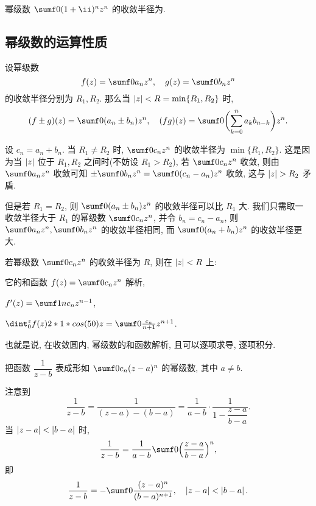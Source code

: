 \begin{exercise}
  幂级数 $\sumf0 (1+\ii)^nz^n$ 的收敛半径为\fillblank[2cm]{}.
\end{exercise}


\subsection{幂级数的运算性质}

\begin{theorem}
  设幂级数
  \[
    f(z)=\sumf0 a_nz^n,\quad
    g(z)=\sumf0 b_nz^n
  \]
  的收敛半径分别为 $R_1,R_2$.
  那么当 $\left|z\right|<R=\min\{R_1,R_2\}$ 时,
  \[
    (f\pm g)(z)=\sumf0 (a_n\pm b_n)z^n,\quad
    (fg)(z)=\sumf0 \biggl(\sum_{k=0}^na_kb_{n-k}\biggr)z^n.
  \]
\end{theorem}

设 $c_n=a_n+b_n$.
当 $R_1\neq R_2$ 时, $\sumf0 c_n z^n$ 的收敛半径为 $\min\{R_1,R_2\}$.
这是因为当 $\left|z\right|$ 位于 $R_1,R_2$ 之间时(不妨设 $R_1>R_2$), 若 $\sumf0 c_n z^n$ 收敛, 则由 $\sumf0 a_n z^n$ 收敛可知   $\pm\sumf0 b_n z^n=\sumf0 (c_n-a_n) z^n$ 收敛, 这与 $\abs{z}>R_2$ 矛盾.

但是若 $R_1=R_2$, 则 $\sumf0 (a_n\pm b_n)z^n$ 的收敛半径可以比 $R_1$ 大. 我们只需取一收敛半径大于 $R_1$ 的幂级数 $\sumf0 c_nz^n$, 并令 $b_n=c_n-a_n$, 则 $\sumf0 a_nz^n,\sumf0 b_nz^n$ 的收敛半径相同, 而 $\sumf0 (a_n+b_n)z^n$ 的收敛半径更大.

\begin{theorem}
  若幂级数 $\sumf0 c_nz^n$ 的收敛半径为 $R$, 则在 $\left|z\right|<R$ 上:
  \begin{enuma}
    \item 它的和函数 $f(z)=\sumf0 c_nz^n$ 解析,
    \item $f'(z)=\sumf1 nc_nz^{n-1}$,
    \item $\dint_0^zf(z)\d z=\sumf0 \frac{c_n}{n+1}z^{n+1}$.
  \end{enuma}
\end{theorem}

也就是说, \alert{在收敛圆内, 幂级数的和函数解析, 且可以逐项求导, 逐项积分}.

\begin{example}
  把函数 $\dfrac1{z-b}$ 表成形如 $\sumf0 c_n(z-a)^n$ 的幂级数, 其中 $a\neq b$.
\end{example}

\begin{solution}
  注意到
  \[
     \frac1{z-b}
    =\frac1{(z-a)-(b-a)}
    =\frac1{a-b}\cdot\frac1{1-\dfrac{z-a}{b-a}}.
  \]
  当 $\left|z-a\right|<\left|b-a\right|$ 时,
  \[
     \frac1{z-b}
    =\frac1{a-b}\sumf0 \Bigl(\frac{z-a}{b-a}\Bigr)^n,
  \]
  即
  \[
     \frac1{z-b}
    =-\sumf0 \frac{(z-a)^n}{(b-a)^{n+1}},
      \quad\abs{z-a}<\abs{b-a}.
  \]
\end{solution}

